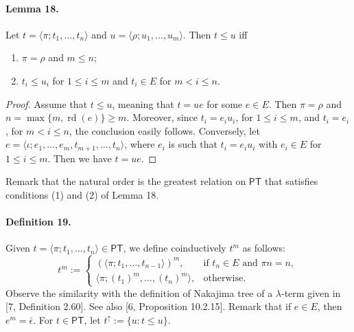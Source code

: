 \paragraph{Lemma 18.} Let $t=\langle\pi;t_1,\ldots,t_n\rangle$ and $u=\langle\rho;u_1,\ldots,u_m\rangle$. Then $t\le u$ iff
\begin{enumerate}
\item $\pi=\rho$ and $m\le n$;
\item $t_i\le u_i$ for $1\le i\le m$ and $t_i\in E$ for $m<i\le n$.
\end{enumerate}
\begin{proof}
Assume that $t\le u$, meaning that $t=ue$ for some $e\in E$. Then $\pi=\rho$ and $n=\max\{m,\operatorname{rd}(e)\}\ge m$.
Moreover, since $t_i=e_iu_i$, for $1\le i\le m$, and $t_i=e_i$, for $m<i\le n$, the conclusion easily follows.
Conversely, let $e=\langle\iota;e_1,\ldots,e_m,t_{m+1},\ldots,t_n\rangle$, where $e_i$ is such that $t_i=e_iu_i$ with $e_i\in E$ for $1\le i\le m$. Then we have $t=ue$.
\end{proof}
Remark that the natural order is the greatest relation on $\mathsf{PT}$ that satisfies conditions (1) and (2) of Lemma 18.
\paragraph{Definition 19.} Given $t=\langle\pi;t_1,\ldots,t_n\rangle\in\mathsf{PT}$, we define coinductively $t^m$ as follows:
\[
t^m:=\begin{cases}
(\langle\pi;t_1,\ldots,t_{n-1}\rangle)^m,&\text{if }t_n\in E\text{ and }\pi n=n,\\
\langle\pi;(t_1)^m,\ldots,(t_n)^m\rangle,&\text{otherwise.}
\end{cases}
\]
Observe the similarity with the definition of Nakajima tree of a $\lambda$-term given in [7, Definition 2.60]. See also [6, Proposition 10.2.15].
Remark that if $e\in E$, then $e^m=\bar\epsilon$.
For $t\in\mathsf{PT}$, let $t^{\uparrow}:=\{u:t\le u\}$.
